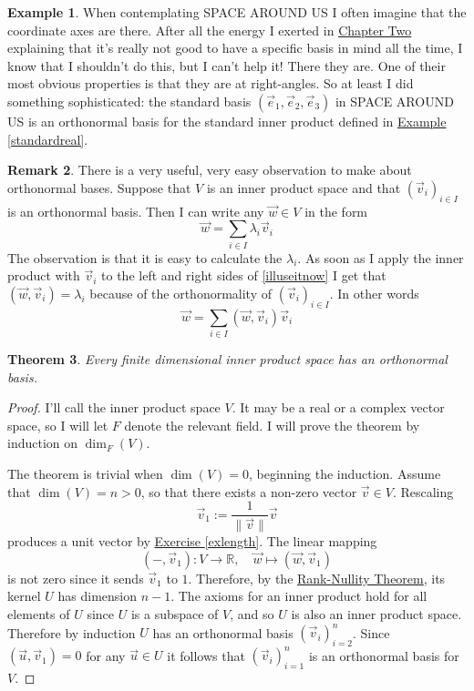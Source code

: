 \documentclass[11pt]{amsbook}
\def\RR{{\mathbb R}}
\newtheorem{theorem}{Theorem}[section]
\theoremstyle{definition}
\newtheorem{rem}[theorem]{Remark}
\newtheorem{ex}[theorem]{Example}
\begin{document}
\begin{ex}
When contemplating SPACE AROUND US I often imagine that the coordinate axes are there. After all the energy I exerted in \hyperref[chap2]{Chapter Two} explaining that it's really not good to have a specific basis in mind all the time, I know that I shouldn't do this, but I can't help it! There they are. One of their most obvious properties is that they are at right-angles. So at least I did something sophisticated: the standard basis $(\vec{e}_1, \vec{e}_2, \vec{e}_3)$ in SPACE AROUND US is an orthonormal basis for the standard inner product defined in \hyperref[standardreal]{Example \ref{standardreal}}.
\end{ex}

\begin{rem}\label{remdec}
There is a very useful, very easy observation to make about orthonormal bases. Suppose that $V$ is an inner product space and that $( \vec{v}_i )_{i\in I}$ is an orthonormal basis. Then I can write any $\vec{w}\in V$ in the form \begin{equation} \label{illuseitnow} \vec{w} = \sum_{i\in I} \lambda_i \vec{v}_i\end{equation} The observation is that it is easy to calculate the $\lambda_i$. As soon as I apply the inner product with $\vec{v}_i$ to the left and right sides of \eqref{illuseitnow} I get that $( \vec{w}, \vec{v}_i) = \lambda_i$ because of the orthonormality of $( \vec{v}_i )_{i\in I}$. In other words \begin{equation} \label{illuseitlater} \vec{w} = \sum_{i\in I} (\vec{w}, \vec{v}_i) \vec{v}_i\end{equation}
\end{rem}

\begin{theorem} \label{orthbasis} Every finite dimensional inner product space has an orthonormal basis.
\end{theorem}

\begin{proof} I'll call the inner product space $V$. It may be a real or a complex vector space, so I will let $F$ denote the relevant field. I will prove the theorem by induction on $\dim_F(V)$.

The theorem is trivial when $\dim (V) = 0$, beginning the induction. Assume that $\dim (V) = n > 0$, so that there exists a non-zero vector $\vec{v} \in V$. Rescaling $$\vec{v}_1 := \frac{1}{\|\vec{v}\|}\vec{v}$$ produces a unit vector by \hyperref[exlength]{Exercise \ref{exlength}}. The linear mapping $$( - , \vec{v}_1) : V\to \RR, \quad \vec{w} \mapsto (\vec{w}, \vec{v}_1) $$ is not zero since it sends $\vec{v}_1$ to $1$. Therefore, by the \hyperref[rnthm]{Rank-Nullity Theorem}, its kernel $U$ has dimension $n-1$. The axioms for an inner product hold for all elements of $U$ since $U$ is a subspace of $V$, and so $U$ is also an inner product space. Therefore by induction $U$ has an orthonormal basis $(\vec{v}_i)_{i=2}^n$. Since $(\vec{u}, \vec{v}_1) = 0$ for any $\vec{u}\in U$ it follows that $(\vec{v}_i)_{i=1}^n$ is an orthonormal basis for $V$.
\end{proof}
\end{document}
